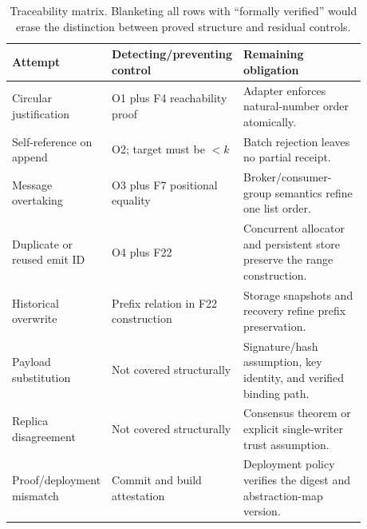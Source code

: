 \documentclass[11pt,letterpaper]{article}
\theoremstyle{definition}
\begin{document}
\begin{table}[h]
\centering
\small
\begin{tabular}{@{}p{0.24\linewidth}p{0.26\linewidth}p{0.38\linewidth}@{}}
\toprule
Attempt & Detecting/preventing control & Remaining obligation \\
\midrule
Circular justification & O1 plus F4 reachability proof & Adapter enforces
natural-number order atomically. \\
Self-reference on append & O2; target must be $<k$ & Batch rejection leaves no
partial receipt. \\
Message overtaking & O3 plus F7 positional equality & Broker/consumer-group
semantics refine one list order. \\
Duplicate or reused emit ID & O4 plus F22 & Concurrent allocator and persistent
store preserve the range construction. \\
Historical overwrite & Prefix relation in F22 construction & Storage snapshots
and recovery refine prefix preservation. \\
Payload substitution & Not covered structurally & Signature/hash assumption,
key identity, and verified binding path. \\
Replica disagreement & Not covered structurally & Consensus theorem or explicit
single-writer trust assumption. \\
Proof/deployment mismatch & Commit and build attestation & Deployment policy
verifies the digest and abstraction-map version. \\
\bottomrule
\end{tabular}
\caption{Traceability matrix. Blanketing all rows with ``formally verified''
would erase the distinction between proved structure and residual controls.}
\end{table}
\end{document}
